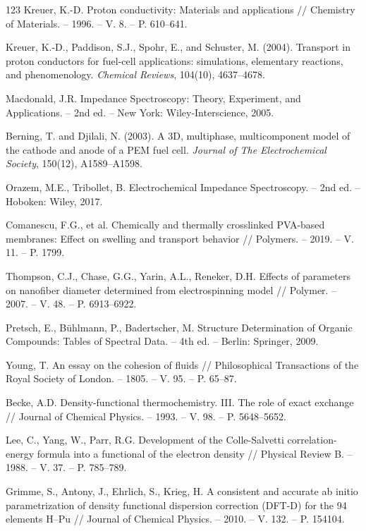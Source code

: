 \documentclass[12pt,a4paper]{report}
\begin{document}
\begin{thebibliography}{123}
 Kreuer, K.-D. Proton conductivity: Materials and applications // Chemistry of Materials. – 1996. – V. 8. – P. 610–641.

 Kreuer, K.-D., Paddison, S.J., Spohr, E., and Schuster, M. (2004). Transport in proton conductors for fuel-cell applications: simulations, elementary reactions, and phenomenology. \textit{Chemical Reviews}, 104(10), 4637–4678.

 Macdonald, J.R. Impedance Spectroscopy: Theory, Experiment, and Applications. – 2nd ed. – New York: Wiley-Interscience, 2005.

 Berning, T. and Djilali, N. (2003). A 3D, multiphase, multicomponent model of the cathode and anode of a PEM fuel cell. \textit{Journal of The Electrochemical Society}, 150(12), A1589–A1598.

 Orazem, M.E., Tribollet, B. Electrochemical Impedance Spectroscopy. – 2nd ed. – Hoboken: Wiley, 2017.

 Comanescu, F.G., et al. Chemically and thermally crosslinked PVA-based membranes: Effect on swelling and transport behavior // Polymers. – 2019. – V. 11. – P. 1799.

 Thompson, C.J., Chase, G.G., Yarin, A.L., Reneker, D.H. Effects of parameters on nanofiber diameter determined from electrospinning model // Polymer. – 2007. – V. 48. – P. 6913–6922.

 Pretsch, E., Bühlmann, P., Badertscher, M. Structure Determination of Organic Compounds: Tables of Spectral Data. – 4th ed. – Berlin: Springer, 2009.

 Young, T. An essay on the cohesion of fluids // Philosophical Transactions of the Royal Society of London. – 1805. – V. 95. – P. 65–87.

 Becke, A.D. Density-functional thermochemistry. III. The role of exact exchange // Journal of Chemical Physics. – 1993. – V. 98. – P. 5648–5652.

 Lee, C., Yang, W., Parr, R.G. Development of the Colle-Salvetti correlation-energy formula into a functional of the electron density // Physical Review B. – 1988. – V. 37. – P. 785–789.

 Grimme, S., Antony, J., Ehrlich, S., Krieg, H. A consistent and accurate ab initio parametrization of density functional dispersion correction (DFT-D) for the 94 elements H–Pu // Journal of Chemical Physics. – 2010. – V. 132. – P. 154104.


\end{thebibliography}
\end{document}
